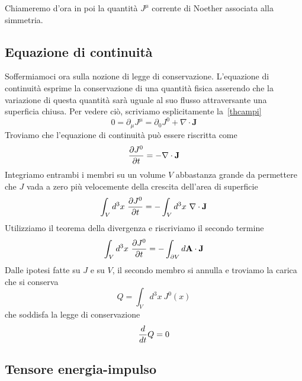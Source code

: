     Chiameremo d'ora in poi la quantità $J^\mu$ corrente di Noether associata alla simmetria. 

\subsection{Equazione di continuità}
    Soffermiamoci ora sulla nozione di legge di conservazione. L'equazione di continuità esprime la conservazione di una quantità fisica asserendo che la variazione di questa quantità sarà uguale al suo flusso attraversante una superficia chiusa. Per vedere ciò, scriviamo esplicitamente la~\eqref{thcampi}
    \begin{equation}
        0 = \partial_\mu J^\mu = \partial_0 J^0 + \nabla \cdot \mathbf J
    \end{equation}
    Troviamo che l'equazione di continuità può essere riscritta come 
    \begin{equation*}
        \frac{\partial J^0}{\partial t} = - \nabla \cdot \mathbf J
    \end{equation*}
    Integriamo entrambi i membri su un volume $V$ abbastanza grande da permettere che $J$ vada a zero più velocemente della crescita dell'area di superficie
    \begin{equation*}
        \int_V d^3 x ~ \frac{\partial J^0}{\partial t} = - \int_V d^3 x ~ \nabla \cdot \mathbf J
    \end{equation*} 
    Utilizziamo il teorema della divergenza e riscriviamo il secondo termine 
    \begin{equation*}
        \int_V d^3 x ~\frac{\partial J^0}{\partial t} = - \int_{\partial V} d \mathbf A \cdot \mathbf J
    \end{equation*} 
    Dalle ipotesi fatte su $J$ e su $V$, il secondo membro si annulla e troviamo la carica che si conserva 
    \begin{equation*}
        Q = \int_V d^3 x ~ J^0(x)
    \end{equation*} 
    che soddisfa la legge di conservazione
    \begin{equation*}
        \frac{d}{dt} Q = 0 
    \end{equation*}

\subsection{Tensore energia-impulso}

